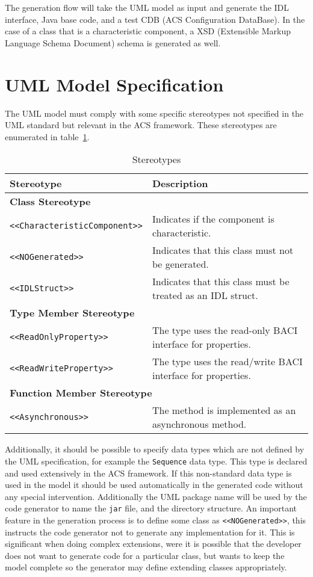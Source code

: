 The generation flow will take the UML model as input and generate
the IDL interface, Java base code,
and a test CDB (ACS Configuration DataBase).
In the case of a class that is a
characteristic component,
a XSD (Extensible Markup Language Schema Document)
schema is generated as well.

\section{UML Model Specification}
\label{sec:uml-model-specification}
The UML model must comply with some specific stereotypes not specified in the UML standard
but relevant in the ACS framework. These stereotypes are enumerated in table~\ref{tb:stereotypes}.
\begin{table}
\centering
\begin{tabular}{|l|l|}
\hline \textbf{Stereotype} & \textbf{Description} \\
\hline \multicolumn{2}{|l|}{\textbf{Class Stereotype}} \\
\hline \texttt{<<CharacteristicComponent>>} & Indicates if the component is characteristic.\\
\hline \texttt{<<NOGenerated>>} & Indicates that this class must not be generated.\\
\hline \texttt{<<IDLStruct>>} & Indicates that this class must be treated as an IDL struct.\\
\hline \multicolumn{2}{|l|}{\textbf{Type Member Stereotype}} \\
\hline \texttt{<<ReadOnlyProperty>>} & The type uses the read-only BACI interface for properties.\\
\texttt{<<ReadWriteProperty>>} & The type uses the read/write BACI interface for properties.\\
\hline \multicolumn{2}{|l|}{\textbf{Function Member Stereotype}} \\
\hline \texttt{<<Asynchronous>>} & The method is implemented as an asynchronous method.\\
\hline
\end{tabular}
\caption{Stereotypes}
\label{tb:stereotypes}
\end{table}
Additionally,
it should be possible to specify data types which are not defined by the UML specification,
for example the \lstinline[language=IDL]!Sequence! data type. This type is declared and used extensively in the ACS framework.
If this non-standard data type is used in the model it should be used automatically in the generated code without
any special intervention.
Additionally the UML package name will be used by the code generator to name the \lstinline[language=sh]!jar! file, and the directory structure.
An important feature in the generation process is to define some class as
\texttt{<<NOGenerated>>}, this instructs the code generator
not to generate any implementation for it.
This is significant when doing complex extensions,
were it is possible that the developer does not want to generate code for a particular class,
but wants to keep the model complete so the generator may define extending classes
appropriately.

